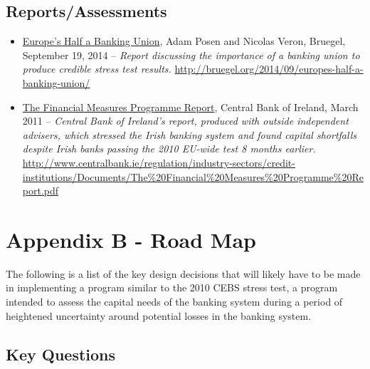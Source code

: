 \documentclass[12pt]{article}
\begin{document}
\subsection{Reports/Assessments}

\begin{itemize}
\item
\ul{Europe's Half a Banking Union}, Adam Posen and Nicolas Veron, Bruegel, September 19, 2014 -- \emph{Report discussing the importance of a banking union to produce credible stress test results.} \url{http://bruegel.org/2014/09/europes-half-a-banking-union/}
\item
\ul{The Financial Measures Programme Report}, Central Bank of Ireland, March 2011 -- \emph{Central Bank of Ireland's report, produced with outside independent advisers, which stressed the Irish banking system and found capital shortfalls despite Irish banks passing the 2010 EU-wide test 8 months earlier.} \url{http://www.centralbank.ie/regulation/industry-sectors/credit-institutions/Documents/The\%20Financial\%20Measures\%20Programme\%20Report.pdf}
\end{itemize}

\section{Appendix B - Road Map}

The following is a list of the key design decisions that will likely have to be made in implementing a program similar to the 2010 CEBS stress test, a program intended to assess the capital needs of the banking system during a period of heightened uncertainty around potential losses in the banking system.

\subsection{Key Questions}
\end{document}
